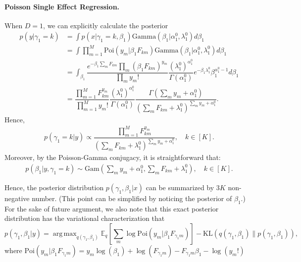 \documentclass[11pt,twoside]{article}
\newcommand{\Ebb}{\ensuremath{\mathbb{E}}}
\DeclareMathOperator*{\argmax}{arg\,max}
\theoremstyle{plain}
\numberwithin{theorem}{section}
\numberwithin{proposition}{section}
\numberwithin{lemma}{section}
\numberwithin{definition}{section}
\numberwithin{condition}{section}
\numberwithin{problem}{section}
\numberwithin{corollary}{section}
\numberwithin{assumption}{section}
\numberwithin{example}{section}
\numberwithin{conjecture}{section}
\theoremstyle{definition}
\numberwithin{remark}{section}
\begin{document}
\paragraph{Poisson Single Effect Regression.} When $D = 1$, we can explicitly calculate the posterior
\begin{align*}
p(y | \gamma_{1} = k) & = \int p(x | \gamma_{1} = k, \beta_1) \mathrm{Gamma}(\beta_{1} | \alpha^{0}_1, \lambda^{0}_1) d\beta_{1} \\
& = \int \prod_{m=1}^{M} \mathrm{Poi}(y_m | \beta_1 F_{km}) \mathrm{Gamma}(\beta_{1} | \alpha^{0}_1, \lambda^{0}_1) d\beta_{1} \\
& = \int_{\beta_{1}} \dfrac{e^{-\beta_{1} \sum_m F_{km}}\prod_m (\beta_{1} F_{km})^{y_{m}}}{\prod_{m} y_{m} !} \dfrac{(\lambda^{0}_1)^{\alpha^{0}_1}}{\Gamma(\alpha^{0}_1)} e^{-\beta_{1} \lambda^{0}_1} \beta_1^{\alpha^{0}_{1} - 1} d \beta_1\\
& = \dfrac{\prod_{m=1}^{M} F_{km}^{y_{m}}}{\prod_{m=1}^{M} y_{m}!} \dfrac{(\lambda^{0}_1)^{\alpha^{0}_1}}{\Gamma(\alpha^{0}_1)} \dfrac{\Gamma(\sum_m y_{m} + \alpha^{0}_1)}{(\sum_{m} F_{km} + \lambda^{0}_1)^{\sum_m y_{m} + \alpha^{0}_1}}. 
\end{align*}
Hence,
\begin{align}
    p(\gamma_1 = k | y) \propto \dfrac{\prod_{m=1}^{M} F_{km}^{y_{m}}}{(\sum_{m} F_{km} + \lambda^{0}_1)^{\sum_m y_{m} + \alpha^{0}_1}}, \quad k \in [K].
\end{align}
Moreover, by the Poisson-Gamma conjugacy, it is straightforward that:
\begin{align}
    p(\beta_1 | y, \gamma_1 = k) \sim \mathrm{Gam}\left(\sum_m y_m + \alpha^{0}_1, \sum_{m} F_{km} + \lambda^{0}_1\right), \quad k \in [K].
\end{align}

Hence, the posterior distribution $p(\gamma_1, \beta_1 | x)$ can be summarized by $3K$ non-negative number. (This point can be simplified by noticing the posterior of $\beta_1$.) For the sake of future argument, we also note that this exact posterior distribution has the variational characterization that
\begin{equation}
    p(\gamma_1, \beta_1 | y) = \argmax_{q(\gamma_1, \beta_1)} \Ebb_q \left[\sum_m \log \mathrm{Poi}(y_m | \beta_1 F_{\gamma_1 m}) \right] - \mathrm{KL}(q(\gamma_1, \beta_1) \| p(\gamma_1, \beta_1)),
\end{equation}
where $\mathrm{Poi}(y_m | \beta_1 F_{\gamma_1 m}) = y_m \log(\beta_1) + \log(F_{\gamma_1 m}) - F_{\gamma_1 m } \beta_1 - \log (y_m!)$
\end{document}
